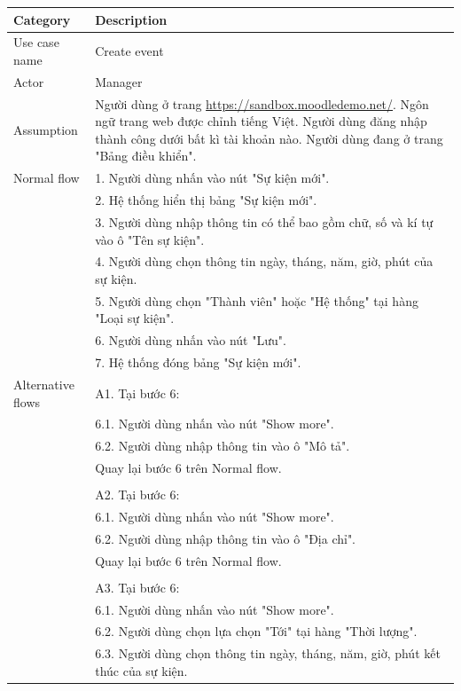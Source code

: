 \documentclass[a4paper, 12pt]{article}
\begin{document}
\begin{table}[H]
    \centering
    \begin{tabular}{|l|p{11cm}|}
        \hline
        Category & Description \\
        \hline
        Use case name & Create event\\
        \hline
        Actor & Manager \\
        \hline
        Assumption & Người dùng ở trang \url{https://sandbox.moodledemo.net/}. Ngôn ngữ trang web được chỉnh tiếng Việt. Người dùng đăng nhập thành công dưới bất kì tài khoản nào. Người dùng đang ở trang "Bảng điều khiển". \\
        \hline
        Normal flow & 1. Người dùng nhấn vào nút "Sự kiện mới". \\
        & 2. Hệ thống hiển thị bảng "Sự kiện mới". \\
        & 3. Người dùng nhập thông tin có thể bao gồm chữ, số và kí tự vào ô "Tên sự kiện". \\
        & 4. Người dùng chọn thông tin ngày, tháng, năm, giờ, phút của sự kiện. \\
        & 5. Người dùng chọn "Thành viên" hoặc "Hệ thống" tại hàng "Loại sự kiện".\\
        & 6. Người dùng nhấn vào nút "Lưu". \\
        & 7. Hệ thống đóng bảng "Sự kiện mới". \\
        \hline
        Alternative flows & A1. Tại bước 6: \\
        & 6.1. Người dùng nhấn vào nút "Show more". \\
        & 6.2. Người dùng nhập thông tin vào ô "Mô tả". \\
        & Quay lại bước 6 trên Normal flow. \\
        & \\
        & A2. Tại bước 6: \\
        & 6.1. Người dùng nhấn vào nút "Show more". \\
        & 6.2. Người dùng nhập thông tin vào ô "Địa chỉ". \\
        & Quay lại bước 6 trên Normal flow. \\
        & \\
        & A3. Tại bước 6: \\
        & 6.1. Người dùng nhấn vào nút "Show more". \\
        & 6.2. Người dùng chọn lựa chọn "Tới" tại hàng "Thời lượng". \\
        & 6.3. Người dùng chọn thông tin ngày, tháng, năm, giờ, phút kết thúc của sự kiện. \\

\end{tabular}
\end{table}
\end{document}
